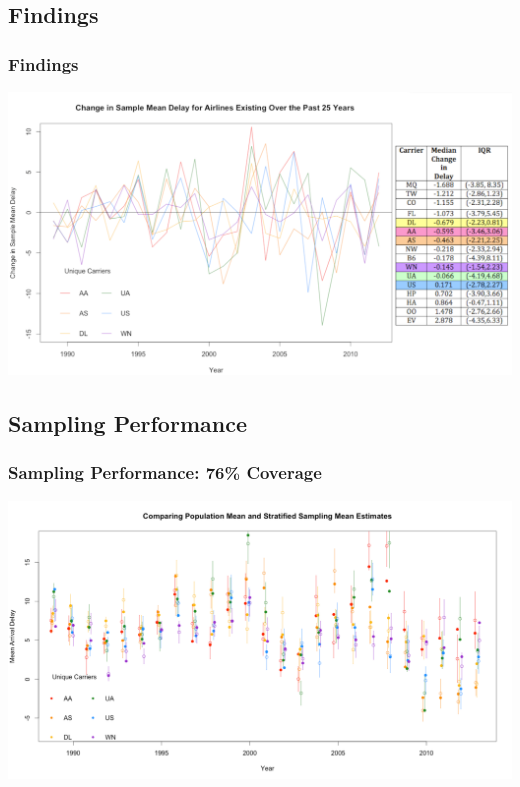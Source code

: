 \documentclass{beamer}
\begin{document}
\subsection{Findings}
\begin{frame}
\frametitle{Findings}
\begin{center} 
\includegraphics[width=1 \textwidth]{summarySamp}
\end{center}

\end{frame}

\subsection{Sampling Performance}
\begin{frame}
\frametitle{Sampling Performance: 76\% Coverage}
\begin{center} 
\includegraphics[width=1 \textwidth]{noLine}
\end{center}

\end{frame}
\end{document}

